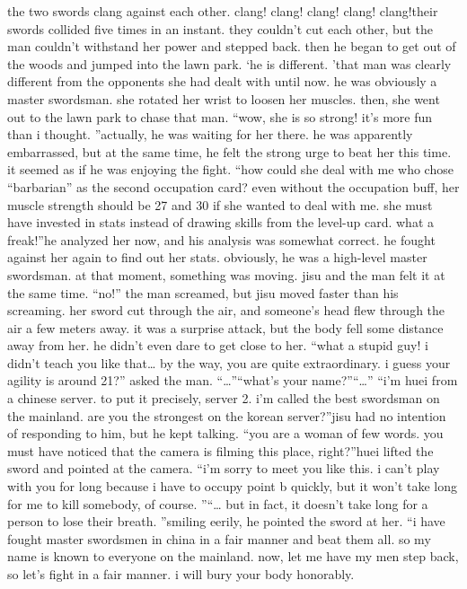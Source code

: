 the two swords clang against each other.
clang! clang! clang! clang! clang!their swords collided five times in an instant.
 they couldn’t cut each other, but the man couldn’t withstand her power and stepped back.
 then he began to get out of the woods and jumped into the lawn park.
‘he is different.
’that man was clearly different from the opponents she had dealt with until now.
 he was obviously a master swordsman.
 she rotated her wrist to loosen her muscles.
 then, she went out to the lawn park to chase that man.
“wow, she is so strong! it’s more fun than i thought.
”actually, he was waiting for her there.
 he was apparently embarrassed, but at the same time, he felt the strong urge to beat her this time.
 it seemed as if he was enjoying the fight.
“how could she deal with me who chose “barbarian” as the second occupation card? even without the occupation buff, her muscle strength should be 27 and 30 if she wanted to deal with me.
 she must have invested in stats instead of drawing skills from the level-up card.
 what a freak!”he analyzed her now, and his analysis was somewhat correct.
 he fought against her again to find out her stats.
 obviously, he was a high-level master swordsman.
at that moment, something was moving.
 jisu and the man felt it at the same time.
“no!” the man screamed, but jisu moved faster than his screaming.
her sword cut through the air, and someone’s head flew through the air a few meters away.
it was a surprise attack, but the body fell some distance away from her.
 he didn’t even dare to get close to her.
“what a stupid guy! i didn’t teach you like that… by the way, you are quite extraordinary.
 i guess your agility is around 21?” asked the man.
“…”“what’s your name?”“…”
“i’m huei from a chinese server.
 to put it precisely, server 2.
 i’m called the best swordsman on the mainland.
 are you the strongest on the korean server?”jisu had no intention of responding to him, but he kept talking.
“you are a woman of few words.
 you must have noticed that the camera is filming this place, right?”huei lifted the sword and pointed at the camera.
“i’m sorry to meet you like this.
 i can’t play with you for long because i have to occupy point b quickly, but it won’t take long for me to kill somebody, of course.
”“… but in fact, it doesn’t take long for a person to lose their breath.
”smiling eerily, he pointed the sword at her.
“i have fought master swordsmen in china in a fair manner and beat them all.
 so my name is known to everyone on the mainland.
 now, let me have my men step back, so let’s fight in a fair manner.
 i will bury your body honorably.
